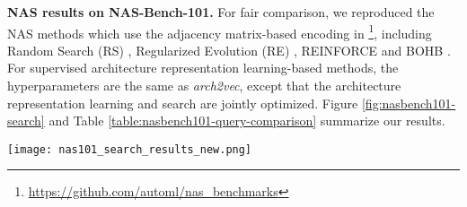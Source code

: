 \textbf{NAS results on NAS-Bench-101.}
For fair comparison, we reproduced the NAS methods which use the adjacency matrix-based encoding in \cite{pmlr-v97-ying19a}\footnote{\url{https://github.com/automl/nas_benchmarks}}, including Random Search (RS) \cite{bergstra12randsearch}, Regularized Evolution (RE) \cite{real2019regularized},  REINFORCE \cite{williams92rl} and BOHB \cite{falkner-icml-18}. 
For supervised architecture representation learning-based  methods, the hyperparameters are the same as \textit{arch2vec}, except that the architecture representation learning and search are jointly optimized. Figure \ref{fig:nasbench101-search} and Table \ref{table:nasbench101-query-comparison} summarize our results. 


\begin{figure*}[ht]
\centering
\texttt{[image: nas101\_search\_results\_new.png]}
\caption{Comparison of NAS performance between discrete encoding, supervised architecture representation learning, and \textit{arch2vec} on NAS-Bench-101. The plot shows the mean test regret (left) and the empirical cumulative distribution of the final test regret (right) of 500 independent runs given  a wall-clock time budget of $1\times10^6$ seconds.}
\vspace{1mm}
\label{fig:nasbench101-search}
\end{figure*}

